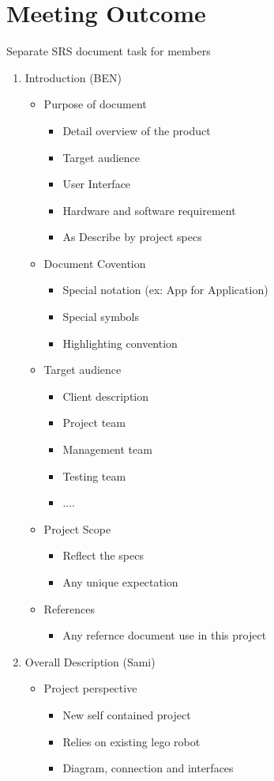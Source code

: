 \documentclass[11pt, a4paper]{article}
\begin{document}
	\section{Meeting Outcome}
	 Separate SRS document task for members
	\begin{enumerate}
		\item Introduction (BEN)
		\begin{itemize}
			\item Purpose of document 
			\begin{itemize}
				\item Detail overview of the product
				\item Target audience
				\item User Interface
				\item Hardware and software requirement
				\item As Describe by project specs 
			\end{itemize}
			\item Document Covention
			\begin{itemize}
				\item Special notation (ex: App for Application)
				\item Special symbols
				\item Highlighting convention
			\end{itemize}
			\item Target audience
			\begin{itemize}
				\item Client description
				\item Project team
				\item Management team
				\item Testing team
				\item ....
			\end{itemize}
			\item  Project Scope
			\begin{itemize}
				\item Reflect the specs
				\item Any unique expectation
			\end{itemize}
			\item References
			\begin{itemize}
				\item Any refernce document use in this project
			\end{itemize}
		\end{itemize}
		\item Overall Description (Sami)
		\begin{itemize}
			\item Project perspective
			\begin{itemize}
				\item New self contained project
				\item Relies on existing lego robot
				\item Diagram, connection and interfaces
			\end{itemize}
		

\end{itemize}
\end{enumerate}
\end{document}
